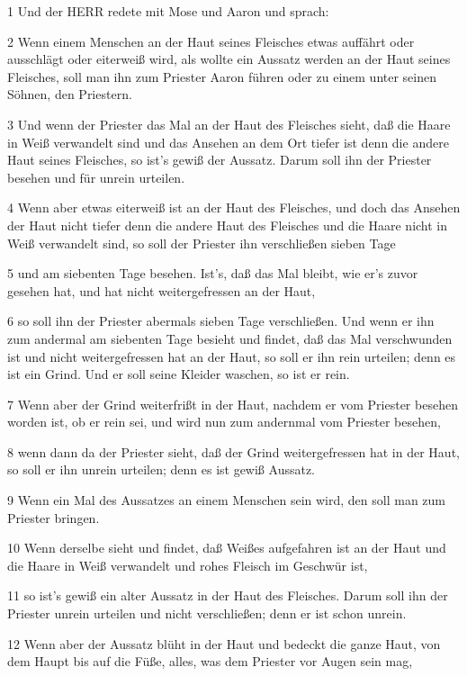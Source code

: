 \par 1 Und der HERR redete mit Mose und Aaron und sprach:
\par 2 Wenn einem Menschen an der Haut seines Fleisches etwas auffährt oder ausschlägt oder eiterweiß wird, als wollte ein Aussatz werden an der Haut seines Fleisches, soll man ihn zum Priester Aaron führen oder zu einem unter seinen Söhnen, den Priestern.
\par 3 Und wenn der Priester das Mal an der Haut des Fleisches sieht, daß die Haare in Weiß verwandelt sind und das Ansehen an dem Ort tiefer ist denn die andere Haut seines Fleisches, so ist's gewiß der Aussatz. Darum soll ihn der Priester besehen und für unrein urteilen.
\par 4 Wenn aber etwas eiterweiß ist an der Haut des Fleisches, und doch das Ansehen der Haut nicht tiefer denn die andere Haut des Fleisches und die Haare nicht in Weiß verwandelt sind, so soll der Priester ihn verschließen sieben Tage
\par 5 und am siebenten Tage besehen. Ist's, daß das Mal bleibt, wie er's zuvor gesehen hat, und hat nicht weitergefressen an der Haut,
\par 6 so soll ihn der Priester abermals sieben Tage verschließen. Und wenn er ihn zum andermal am siebenten Tage besieht und findet, daß das Mal verschwunden ist und nicht weitergefressen hat an der Haut, so soll er ihn rein urteilen; denn es ist ein Grind. Und er soll seine Kleider waschen, so ist er rein.
\par 7 Wenn aber der Grind weiterfrißt in der Haut, nachdem er vom Priester besehen worden ist, ob er rein sei, und wird nun zum andernmal vom Priester besehen,
\par 8 wenn dann da der Priester sieht, daß der Grind weitergefressen hat in der Haut, so soll er ihn unrein urteilen; denn es ist gewiß Aussatz.
\par 9 Wenn ein Mal des Aussatzes an einem Menschen sein wird, den soll man zum Priester bringen.
\par 10 Wenn derselbe sieht und findet, daß Weißes aufgefahren ist an der Haut und die Haare in Weiß verwandelt und rohes Fleisch im Geschwür ist,
\par 11 so ist's gewiß ein alter Aussatz in der Haut des Fleisches. Darum soll ihn der Priester unrein urteilen und nicht verschließen; denn er ist schon unrein.
\par 12 Wenn aber der Aussatz blüht in der Haut und bedeckt die ganze Haut, von dem Haupt bis auf die Füße, alles, was dem Priester vor Augen sein mag,
